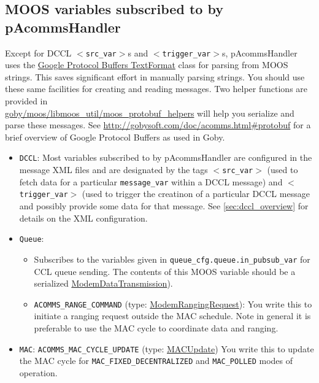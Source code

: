 \documentclass[11pt, letterpaper, oneside]{memoir}
\newcommand{\xmltag}[1]{\texttt{$<$#1$>$}}
\begin{document}
\subsection{MOOS variables subscribed to by pAcommsHandler}

Except for DCCL \xmltag{src\_var}s and \xmltag{trigger\_var}s, pAcommsHandler uses the \href{http://code.google.com/apis/protocolbuffers/docs/reference/cpp/google.protobuf.text_format.html}{Google Protocol Buffers TextFormat} class for parsing from MOOS strings. This saves significant effort in manually parsing strings. You should use these same facilities for creating and reading messages. Two helper functions are provided in \\ \href{http://gobysoft.com/doc/moos__protobuf__helpers_8h.html}{goby/moos/libmoos\_util/moos\_protobuf\_helpers} will help you serialize and parse these messages. See \url{http://gobysoft.com/doc/acomms.html#protobuf} for a brief overview of Google Protocol Buffers as used in Goby.

\begin{itemize}
\item \verb|DCCL|: Most variables subscribed to by pAcommsHandler are configured in the message XML files and are designated by the tags \xmltag{src\_var} (used to fetch data for a particular \verb|message_var| within a DCCL message) and \xmltag{trigger\_var} (used to trigger the creatinon of a particular DCCL message and possibly provide some data for that message. See \ref{sec:dccl_overview} for details on the XML configuration. 
\item \verb|Queue|:
\begin{itemize}
\item Subscribes to the variables given in \verb|queue_cfg.queue.in_pubsub_var| for CCL queue sending. The contents of this MOOS variable should be a serialized \href{http://gobysoft.com/doc/modem__message_8proto_source.html}{ModemDataTransmission}). 
\item \verb|ACOMMS_RANGE_COMMAND| (type: \href{http://gobysoft.com/doc/modem__message_8proto_source.html}{ModemRangingRequest}): You write this to initiate a ranging request outside the MAC schedule. Note in general it is preferable to use the MAC cycle to coordinate data and ranging.
\end{itemize}
\item \verb|MAC|: \verb|ACOMMS_MAC_CYCLE_UPDATE| (type: \href{http://gobysoft.com/doc/amac_8proto_source.html}{MACUpdate}) You write this to update the MAC cycle for \verb|MAC_FIXED_DECENTRALIZED| and \verb|MAC_POLLED| modes of operation.
\end{itemize}
\end{document}
